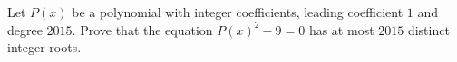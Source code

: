Let $P(x)$ be a polynomial with integer coefficients, leading coefficient $1$ and degree $2015$. Prove that the equation $P(x)^2-9=0$ has at most $2015$ distinct integer roots.
